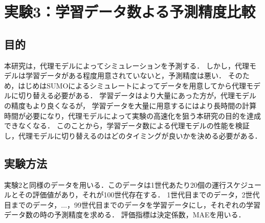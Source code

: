 \documentclass[main]{subfiles}
\begin{document}
\chapter{実験3：学習データ数よる予測精度比較}
    \section{目的}
    本研究は，代理モデルによってシミュレーションを予測する．
    しかし，代理モデルは学習データがある程度用意されていないと，予測精度は悪い．
    そのため，はじめはSUMOによるシミュレートによってデータを用意してから代理モデルに切り替える必要がある．
    学習データはより大量にあった方が，代理モデルの精度もより良くなるが，
    学習データを大量に用意するにはより長時間の計算時間が必要になり，代理モデルによって実験の高速化を狙う本研究の目的を達成できなくなる．
    このことから，学習データ数による代理モデルの性能を検証し，代理モデルに切り替えるのはどのタイミングが良いかを決める必要がある．

    \section{実験方法}
    実験2と同様のデータを用いる．このデータは1世代あたり20個の運行スケジュールとその評価値があり，それが100世代存在する．
    1世代目までのデータ，2世代目までのデータ，$\dots$，99世代目までのデータを学習データにし，それぞれの学習データ数の時の予測精度を求める．
    評価指標は決定係数，MAEを用いる．
\end{document}
